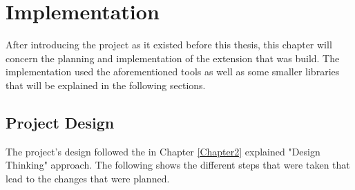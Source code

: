 
\chapter{Implementation} %
\label{Chapter4} %

After introducing the project as it existed before this thesis,
this chapter will concern the planning and implementation of the extension that was build.
The implementation used the aforementioned tools as well as some smaller libraries that will be explained in the following sections.

\section{Project Design}
The project's design followed the in Chapter \ref{Chapter2} explained "Design Thinking" approach.
The following shows the different steps that were taken that lead to the changes that were planned.

